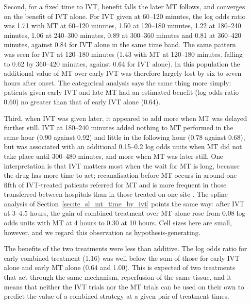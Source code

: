 Second, for a fixed time to IVT, benefit falls the later MT follows, and converges on the benefit of IVT alone. For IVT given at 60--120 minutes, the log odds ratio was 1.71 with MT at 60--120 minutes, 1.50 at 120--180 minutes, 1.22 at 180--240 minutes, 1.06 at 240--300 minutes, 0.89 at 300--360 minutes and 0.81 at 360--420 minutes, against 0.84 for IVT alone in the same time band. The same pattern was seen for IVT at 120--180 minutes (1.43 with MT at 120--180 minutes, falling to 0.62 by 360--420 minutes, against 0.64 for IVT alone). In this population the additional value of MT over early IVT was therefore largely lost by six to seven hours after onset. The categorical analysis says the same thing more simply: patients given early IVT and late MT had an estimated benefit (log odds ratio 0.60) no greater than that of early IVT alone (0.64).

Third, when IVT was given later, it appeared to add more when MT was delayed further still. IVT at 180--240 minutes added nothing to MT performed in the same hour (0.90 against 0.92) and little in the following hour (0.78 against 0.68), but was associated with an additional 0.15--0.2 log odds units when MT did not take place until 300--480 minutes, and more when MT was later still. One interpretation is that IVT matters most when the wait for MT is long, because the drug has more time to act; recanalisation before MT occurs in around one fifth of IVT-treated patients referred for MT and is more frequent in those transferred between hospitals than in those treated on one site . The spline analysis of Section~\ref{sec:te_sl_mt_time_by_ivt} points the same way: after IVT at 3--4.5 hours, the gain of combined treatment over MT alone rose from 0.08 log odds units with MT at 4 hours to 0.30 at 10 hours. Cell sizes here are small, however, and we regard this observation as hypothesis-generating.

The benefits of the two treatments were less than additive. The log odds ratio for early combined treatment (1.16) was well below the sum of those for early IVT alone and early MT alone (0.64 and 1.00). This is expected of two treatments that act through the same mechanism, reperfusion of the same tissue, and it means that neither the IVT trials nor the MT trials can be used on their own to predict the value of a combined strategy at a given pair of treatment times.


